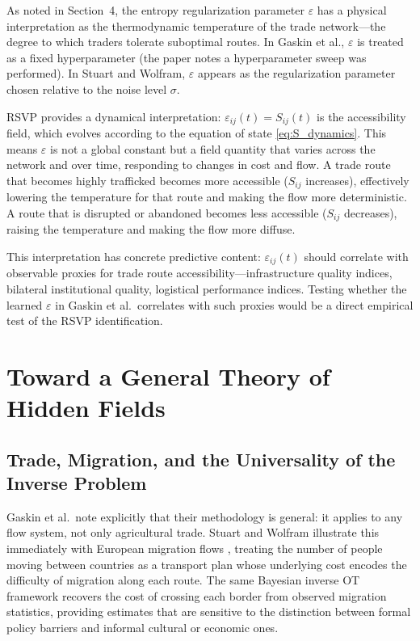 \documentclass[12pt]{article}
\newcommand{\eps}{\varepsilon}
\begin{document}
As noted in Section~4, the entropy regularization parameter $\eps$ has a physical interpretation as the thermodynamic temperature of the trade network---the degree to which traders tolerate suboptimal routes. In Gaskin et al., $\eps$ is treated as a fixed hyperparameter (the paper notes a hyperparameter sweep was performed). In Stuart and Wolfram, $\eps$ appears as the regularization parameter chosen relative to the noise level $\sigma$.

RSVP provides a dynamical interpretation: $\eps_{ij}(t) = S_{ij}(t)$ is the accessibility field, which evolves according to the equation of state \eqref{eq:S_dynamics}. This means $\eps$ is not a global constant but a field quantity that varies across the network and over time, responding to changes in cost and flow. A trade route that becomes highly trafficked becomes more accessible ($S_{ij}$ increases), effectively lowering the temperature for that route and making the flow more deterministic. A route that is disrupted or abandoned becomes less accessible ($S_{ij}$ decreases), raising the temperature and making the flow more diffuse.

This interpretation has concrete predictive content: $\eps_{ij}(t)$ should correlate with observable proxies for trade route accessibility---infrastructure quality indices, bilateral institutional quality, logistical performance indices. Testing whether the learned $\eps$ in Gaskin et al.\ correlates with such proxies would be a direct empirical test of the RSVP identification.

\section{Toward a General Theory of Hidden Fields}

\subsection{Trade, Migration, and the Universality of the Inverse Problem}

Gaskin et al.\ note explicitly that their methodology is general: it applies to any flow system, not only agricultural trade. Stuart and Wolfram illustrate this immediately with European migration flows \citep{raymer2013, abel2014}, treating the number of people moving between countries as a transport plan whose underlying cost encodes the difficulty of migration along each route. The same Bayesian inverse OT framework recovers the cost of crossing each border from observed migration statistics, providing estimates that are sensitive to the distinction between formal policy barriers and informal cultural or economic ones.
\end{document}
